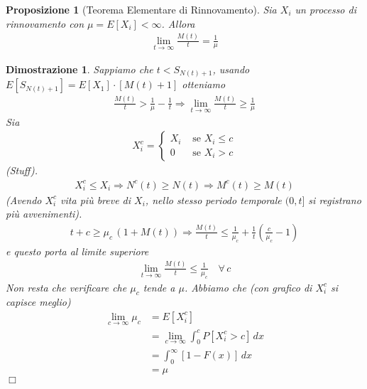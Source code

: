 \documentclass{article}
\newtheorem{proposizione}{Proposizione}[section]
\newtheorem*{dimostrazione*}{Dimostrazione}
\newcommand*{\QED}{\hfill\ensuremath{\Box}}
\begin{document}
\begin{proposizione}[Teorema Elementare di Rinnovamento]
\label{pr_teorema_elementare_rinnovamento}
Sia $X_i$ un processo di rinnovamento con $\mu = E[X_i] < \infty$. Allora
\begin{align}
\lim_{t\to\infty} \frac{M(t)}{t} = \frac{1}{\mu}
\end{align}
\end{proposizione}
\begin{dimostrazione*}
Sappiamo che $t<S_{N(t)+1}$, usando $E[S_{N(t)+1}] = E[X_1]\cdot[M(t)+1]$ otteniamo
\begin{gather*}
\frac{M(t)}{t} > \frac{1}{\mu} - \frac{1}{t} \Rightarrow \lim_{t\to\infty} \frac{M(t)}{t} \ge \frac{1}{\mu}
\end{gather*}
Sia
\begin{align*}
X_i^c = \begin{cases}
X_i & \text{ se } X_i \le c\\
0 & \text{ se } X_i > c
\end{cases}
\end{align*}
\emph{(Stuff)}.
\begin{gather*}
X_i^c \le X_i \Rightarrow N^c(t)\ge N(t) \Rightarrow M^c(t) \ge M(t)
\end{gather*}
\emph{(Avendo $X_i^c$ vita più breve di $X_i$, nello stesso periodo temporale $(0,t]$ si registrano più avvenimenti)}.
\begin{gather*}
t+c \ge \mu_c\,(1+M(t)) \Rightarrow \frac{M(t)}{t} \le \frac{1}{\mu_c} + \frac{1}{t}\left(\frac{c}{\mu_c}-1\right)
\end{gather*}
e questo porta al limite superiore
\begin{gather*}
\lim_{t\to\infty}\frac{M(t)}{t} \le \frac{1}{\mu_c} \quad \forall\,c
\end{gather*}
Non resta che verificare che $\mu_c$ tende a $\mu$. Abbiamo che \emph{(con grafico di $X_i^c$ si capisce meglio)}
\begin{align*}
\lim_{c\to\infty} \mu_c &= E[X_i^c]\\
&= \lim_{c\to\infty}\int_0^{c} P[X_i^c > c]\,dx\\
&= \int_{0}^{\infty}[1-F(x)]\,dx\\
&= \mu
\end{align*}
\QED
\end{dimostrazione*}
\end{document}
